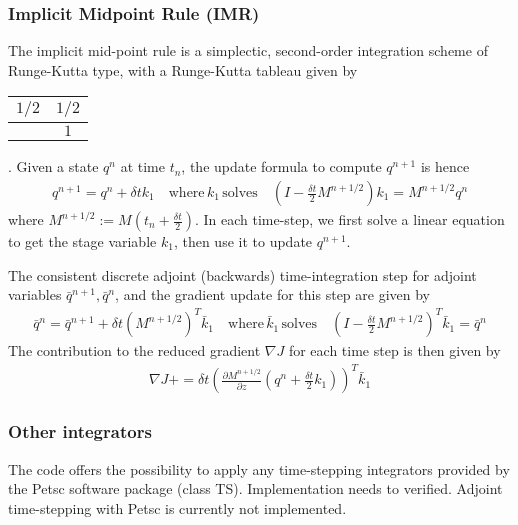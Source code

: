 \documentclass[letterpaper]{article}
\begin{document}
    \subsubsection{Implicit Midpoint Rule (IMR)} 
    The implicit mid-point rule is a simplectic, second-order integration scheme
    of Runge-Kutta type, with a Runge-Kutta tableau given by
    \begin{tabular}{ c | c }
      $1/2$ & $ 1/2$ \\
      \hline
                &  $1$
    \end{tabular}.
    Given a state $q^n$ at time $t_n$, the update formula to compute $q^{n+1}$
    is hence 
    \begin{align}
      q^{n+1} = q^n + \delta t k_1 \quad \text{where} \, k_1 \, \text{solves}
      \quad \left( I-\frac{\delta t}{2} M^{n+1/2} \right) k_1 = M^{n+1/2}  q^n
    \end{align}
    where $M^{n+1/2} := M(t_n + \frac{\delta t}{2})$. In each time-step, we
    first solve a linear equation to get the stage variable $k_1$, then use it
    to update $q^{n+1}$. 

    The consistent discrete adjoint (backwards) time-integration step for
    adjoint variables $\bar q^{n+1}, \bar q^n$, and the gradient update for this
    step are given by
    \begin{align}
      \bar q^{n} = \bar q^{n+1} + \delta t \left(M^{n+1/2}\right)^T \bar k_1
      \quad \text{where} \, \bar k_1 \, \text{solves} \quad \left(
      I-\frac{\delta t}{2} M^{n+1/2}\right)^T  \bar k_1 = \bar q^n 
    \end{align}
    The contribution to the reduced gradient $\nabla J$ for each time step is
    then given by
    \begin{align}
      \nabla J += \delta t \left( \frac{\partial M^{n+1/2}}{\partial z}
      \left(q^n + \frac{\delta t}{2} k_1\right) \right)^T\bar k_1
    \end{align}


    \subsubsection{Other integrators}
    The code offers the possibility to apply any time-stepping integrators
    provided by the Petsc software package (class TS). Implementation needs to
    verified. Adjoint time-stepping with Petsc is currently not implemented. 
\end{document}
